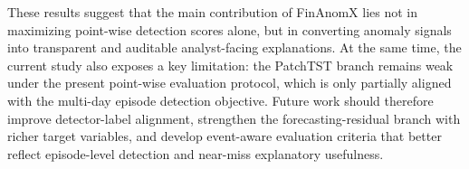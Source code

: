 \documentclass[11pt,a4paper,twoside]{article}
\begin{document}
These results suggest that the main contribution of FinAnomX lies not in maximizing point-wise detection scores alone, but in converting anomaly signals into transparent and auditable analyst-facing explanations. At the same time, the current study also exposes a key limitation: the PatchTST branch remains weak under the present point-wise evaluation protocol, which is only partially aligned with the multi-day episode detection objective. Future work should therefore improve detector-label alignment, strengthen the forecasting-residual branch with richer target variables, and develop event-aware evaluation criteria that better reflect episode-level detection and near-miss explanatory usefulness.

\clearpage

\begingroup
\setlength{\parskip}{0pt}
\end{document}
